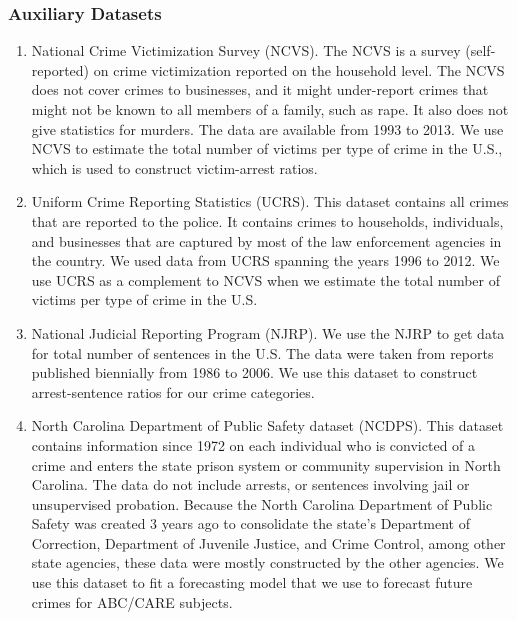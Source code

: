 \subsubsection{Auxiliary Datasets}
\begin{enumerate}
\item National Crime Victimization Survey (NCVS). The NCVS is a survey (self-reported) on crime victimization reported on the household level. The NCVS does not cover crimes to businesses, and it might under-report crimes that might not be known to all members of a family, such as rape. It also does not give statistics for murders. The data are available from 1993 to 2013. We use NCVS to estimate the total number of victims per type of crime in the U.S., which is used to construct victim-arrest ratios.
\item Uniform Crime Reporting Statistics (UCRS). This dataset contains all crimes that are reported to the police. It contains crimes to households, individuals, and businesses that are captured by most of the law enforcement agencies in the country. We used data from UCRS spanning the years 1996 to 2012. We use UCRS as a complement to NCVS when we estimate the total number of victims per type of crime in the U.S. %
\item National Judicial Reporting Program (NJRP). We use the NJRP to get data for total number of sentences in the U.S. The data were taken from reports published biennially from 1986 to 2006. We use this dataset to construct arrest-sentence ratios for our crime categories.
\item North Carolina Department of Public Safety dataset (NCDPS). This dataset contains information since 1972 on each individual who is convicted of a crime and enters the state prison system or community supervision in North Carolina. The data do not include arrests, or sentences involving jail or unsupervised probation. Because the North Carolina Department of Public Safety was created 3 years ago to consolidate the state's Department of Correction, Department of Juvenile Justice, and Crime Control, among other state agencies, these data were mostly constructed by the other agencies. We use this dataset to fit a forecasting model that we use to forecast future crimes for ABC/CARE subjects.
\end{enumerate}

